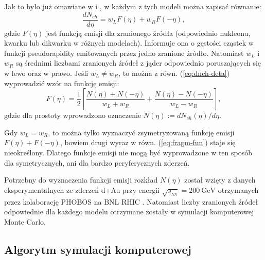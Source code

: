 \documentclass[a4paper,12pt]{article}
\begin{document}
Jak to było już omawiane w \cite{Barej:pracaInz18} i \cite{Barej:2017kcw}, w każdym z tych modeli można zapisać równanie:
\begin{equation} \label{eq:dnch-deta}
\frac{dN_{ch}}{d\eta} = w_{L} F(\eta) + w_{R} F(-\eta),
\end{equation}
gdzie $F(\eta)$ jest funkcją emisji dla zranionego źródła (odpowiednio nukleonu, kwarku lub dikwarku w różnych modelach). Informuje ona o gęstości cząstek w funkcji pseudorapidity emitowanych przez jedno zranione źródło. Natomiast $w_{L}$ i $w_{R}$ są średnimi liczbami zranionych źródeł z jąder odpowiednio poruszających się w lewo oraz w prawo. Jeśli $w_{L} \neq w_{R}$, to można z równ. (\ref{eq:dnch-deta}) wyprowadzić wzór na funkcję emisji:
\begin{equation} \label{eq:fragm-fun}
F(\eta) = \frac{1}{2} \left[ \frac{N(\eta) + N(-\eta)}{w_{L} + w_{R}} + \frac{N(\eta) - N(-\eta)}{w_{L} - w_{R}} \right],
\end{equation}
gdzie dla prostoty wprowadzono oznaczenie $N(\eta) := dN_{ch}(\eta)/d\eta$.

Gdy $w_{L} = w_{R}$, to można tylko wyznaczyć zsymetryzowaną funkcję emisji $F(\eta) + F(-\eta)$, bowiem drugi wyraz w równ. (\ref{eq:fragm-fun}) staje się nieokreślony. Dlatego funkcje emisji nie mogą być wyprowadzone w ten sposób dla symetrycznych, ani dla bardzo peryferycznych zderzeń.

Potrzebny do wyznaczenia funkcji emisji rozkład $N(\eta)$ został wzięty z danych eksperymentalnych ze zderzeń d+Au przy energii $\sqrt{s_{_{NN}}} = 200~\text{GeV}$ otrzymanych przez kolaborację PHOBOS na BNL RHIC \cite{Back:2004mr}. Natomiast liczby zranionych źródeł odpowiednie dla każdego modelu otrzymane zostały w symulacji komputerowej Monte Carlo.

\subsection{Algorytm symulacji komputerowej} \label{algorytm}
\end{document}
